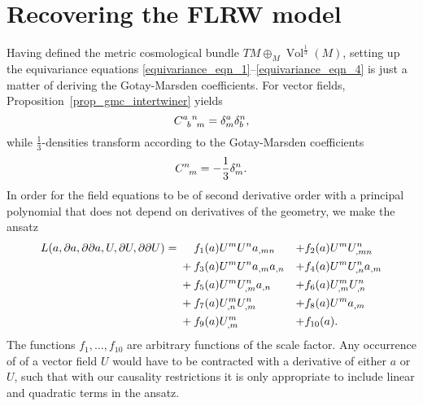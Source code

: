 \section{Recovering the FLRW model}
Having defined the metric cosmological bundle $TM \oplus_M \operatorname{Vol}^{\frac{1}{3}}(M)$, setting up the equivariance equations \eqref{equivariance_eqn_1}--\eqref{equivariance_eqn_4} is just a matter of deriving the Gotay-Marsden coefficients. For vector fields, Proposition~\ref{prop_gmc_intertwiner} yields
\begin{equation}
  \gmc{a}{b}{n}{m} = \delta^a_m \delta^n_b,
\end{equation}
while $\frac{1}{3}$-densities transform according to the Gotay-Marsden coefficients
\begin{equation}
  \gmc{}{}{n}{m} = -\frac{1}{3} \delta^n_m.
\end{equation}
In order for the field equations to be of second derivative order with a principal polynomial that does not depend on derivatives of the geometry, we make the ansatz
\begin{equation}
  \begin{aligned}
    L(a,\partial a, \partial\partial a, U, \partial U, \partial\partial U) = {} & \mathbin{\hphantom{+}} f_1(a) U^m U^n a_{,mn} & + & f_2(a) U^m U^n_{,mn} \\
    {} & + f_3(a) U^m U^n a_{,m} a_{,n} & + & f_4(a) U^m U^n_{,n} a_{,m} \\
    {} & + f_5(a) U^m U^n_{,m} a_{,n} & + & f_6(a) U^m_{,m} U^n_{,n} \\
    {} & + f_7(a) U^m_{,n} U^n_{,m} & + & f_8(a) U^m a_{,m} \\
    {} & + f_9(a) U^m_{,m} & + & f_{10}(a).
  \end{aligned}
\end{equation}
The functions $f_1,\dots, f_{10}$ are arbitrary functions of the scale factor. Any occurrence of of a vector field $U$ would have to be contracted with a derivative of either $a$ or $U$, such that with our causality restrictions it is only appropriate to include linear and quadratic terms in the ansatz.

